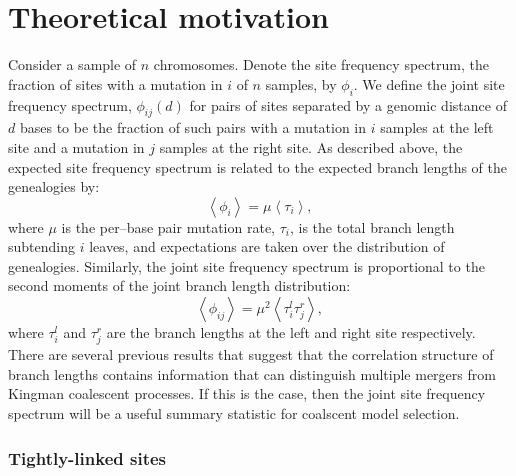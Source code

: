 \documentclass[11pt, letterpaper]{article}   	%
\newcommand{\E}[1]{\left<{#1}\right>}
\begin{document}
\section*{Theoretical motivation}

Consider a sample of $n$ chromosomes.
Denote the site frequency spectrum, the fraction of sites with a mutation in $i$ of $n$ samples, by $\phi_i$.
We define the joint site frequency spectrum, $\phi_{ij}(d)$ for pairs of sites separated by a genomic distance of $d$ bases to be the fraction of such pairs with a mutation in $i$ samples at the left site and a mutation in $j$ samples at the right site.
As described above, the expected site frequency spectrum is related to the expected branch lengths of the genealogies by:
\begin{equation}
\E{\phi_i} = \mu \E{\tau_i},
\end{equation}
where $\mu$ is the per--base pair mutation rate, $\tau_i$, is the total branch length subtending $i$ leaves, and expectations are taken over the distribution of genealogies.
Similarly, the joint site frequency spectrum is proportional to the second moments of the joint branch length distribution:
\begin{equation}
\E{\phi_{ij}} = \mu^2 \E{\tau_i^l \tau_j^r},
\end{equation}
where $\tau_i^l$ and $\tau_j^r$ are the branch lengths at the left and right site respectively.
There are several previous results that suggest that the correlation structure of branch lengths contains information that can distinguish multiple mergers from Kingman coalescent processes.
If this is the case, then the joint site frequency spectrum will be a useful summary statistic for coalscent model selection.

\subsubsection*{Tightly-linked sites}
\end{document}
